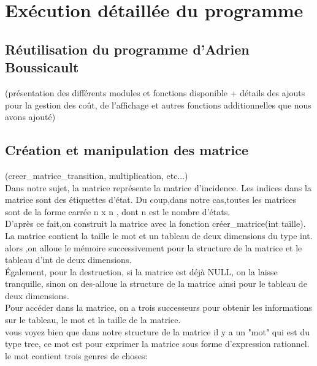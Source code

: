 \documentclass{report}
\begin{document}
\part{Exécution détaillée du programme}

\chapter{Réutilisation du programme d'Adrien Boussicault}

(présentation des différents modules et fonctions disponible + détails des ajouts pour la gestion des coût, de l'affichage et autres fonctions additionnelles que nous avons ajouté)

\chapter{Création et manipulation des matrice}
(creer\_matrice\_transition, multiplication, etc...)\\


Dans notre sujet, la matrice représente la matrice d'incidence. Les indices dans la matrice sont des étiquettes d'état. Du coup,dans notre cas,toutes les matrices sont de la forme carrée n x n ,  dont n est le nombre d'états.\\

D'après ce fait,on construit la matrice avec la fonction créer\_matrice(int taille). La matrice contient la taille le mot et un tableau de deux dimensions du type int. alors ,on alloue le mémoire successivement pour la structure de la matrice et le tableau d'int de deux dimensions.\\

Également, pour la destruction, si la matrice est déjà NULL, on la laisse tranquille, sinon on des-alloue la structure de la matrice ainsi pour le tableau de deux dimensions.\\

Pour accéder dans la matrice, on a trois successeurs pour obtenir les informations sur le tableau, le mot et la taille de la matrice. \\

vous voyez bien que dans notre structure de la matrice il y a un "mot" qui est du type tree, ce mot est pour exprimer la matrice sous forme d'expression rationnel. le mot contient trois genres de choses: 
\end{document}
